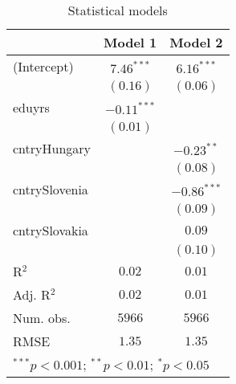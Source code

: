 
\begin{table}
\begin{center}
\begin{tabular}{l c c}
\hline
 & Model 1 & Model 2 \\
\hline
(Intercept)   & $7.46^{***}$  & $6.16^{***}$  \\
              & $(0.16)$      & $(0.06)$      \\
eduyrs        & $-0.11^{***}$ &               \\
              & $(0.01)$      &               \\
cntryHungary  &               & $-0.23^{**}$  \\
              &               & $(0.08)$      \\
cntrySlovenia &               & $-0.86^{***}$ \\
              &               & $(0.09)$      \\
cntrySlovakia &               & $0.09$        \\
              &               & $(0.10)$      \\
\hline
R$^2$         & $0.02$        & $0.01$        \\
Adj. R$^2$    & $0.02$        & $0.01$        \\
Num. obs.     & $5966$        & $5966$        \\
RMSE          & $1.35$        & $1.35$        \\
\hline
\multicolumn{3}{l}{\scriptsize{$^{***}p<0.001$; $^{**}p<0.01$; $^{*}p<0.05$}}
\end{tabular}
\caption{Statistical models}
\label{table:coefficients}
\end{center}
\end{table}
